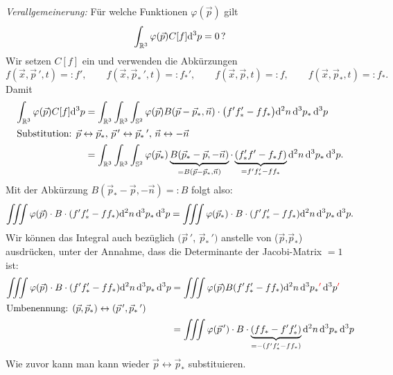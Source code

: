 \emph{Verallgemeinerung:} Für welche Funktionen $\varphi(\vec{p})$ gilt
\[ \int_{\mathbb{R}^3} \varphi(\vec{p}) C[f] \mathrm{d}^3 p = 0 \, ? \]
Wir setzen $C[f]$ ein und verwenden die Abkürzungen
\[ f( \vec{x}, \vec{p}\,', t ) =: f', \qquad
  f( \vec{x}, \vec{p}_*\,', t ) =: f_*', \qquad
  f( \vec{x}, \vec{p}, t ) =: f, \qquad
  f( \vec{x}, \vec{p}_*, t ) =: f_*. \]
Damit 
\begin{align*}
  \int_{\mathbb{R}^3} \varphi(\vec{p}) C[f] \mathrm{d}^3 p
  &= \int_{\mathbb{R}^3} \int_{\mathbb{R}^3} \int_{\mathbb{S}^2}
    \varphi(\vec{p})
    B(\vec{p} - \vec{p}_*, \vec{n}) \cdot
    \big( f' f_*' - f f_* \big)
    \mathrm{d}^2 n \, \mathrm{d}^3 p_* \, \mathrm{d}^3 p \\
  \intertext{Substitution: $\vec{p} \leftrightarrow \vec{p}_*$,
  $\vec{p}\,' \leftrightarrow \vec{p}_*\,'$, $\vec{n} \leftrightarrow -\vec{n}$}
  &= \int_{\mathbb{R}^3} \int_{\mathbb{R}^3} \int_{\mathbb{S}^2}
    \varphi( \vec{p}_* )
    \underbrace{B(\vec{p}_* - \vec{p}, - \vec{n})}_{= B(\vec{p} - \vec{p}_*, \vec{n})} \cdot
    \underbrace{(f_*' f' - f_* f)}_{=f' f_*' - f f_*}
    \mathrm{d}^2 n \, \mathrm{d}^3 p_* \, \mathrm{d}^3 p.
\end{align*}
Mit der Abkürzung $B(\vec{p}_* - \vec{p}, - \vec{n}) =: B$ folgt also:
\[ \iiint \varphi(\vec{p}) \cdot B \cdot (f' f_*' - f f_*)
  \mathrm{d}^2 n \, \mathrm{d}^3 p_* \, \mathrm{d}^3 p
  = \iiint \varphi(\vec{p}_*) \cdot B \cdot (f' f_*' - f f_*)
  \mathrm{d}^2 n \, \mathrm{d}^3 p_* \, \mathrm{d}^3 p. \]
Wir können das Integral auch bezüglich $(\vec{p}\,'$, $\vec{p}_*\,')$ anstelle
von ($\vec{p}$,$\vec{p}_*$) ausdrücken, unter der Annahme, dass die Determinante
der Jacobi-Matrix $=1$ ist:
\begin{align*}
  \iiint \varphi(\vec{p}) \cdot B \cdot (f' f_*' - f f_*)
    \mathrm{d}^2 n \, \mathrm{d}^3 p_* \, \mathrm{d}^3 p
  &= \iiint \varphi(\vec{p}) B (f' f_*' - f f_*)
    \mathrm{d}^2 n \, \mathrm{d}^3 p_*{\color{red}'} \, \mathrm{d}^3 p{\color{red}'} \\
  \intertext{Umbenennung: $(\vec{p}, \vec{p}_*) \leftrightarrow (\vec{p}\,',
  \vec{p}_*\,')$}
  &= \iiint \varphi(\vec{p}\,') \cdot B \cdot
    \underbrace{(f f_* - f' f_*')}_{= - (f'f_*' - ff_*)}
    \mathrm{d}^2 n \, \mathrm{d}^3 p_* \, \mathrm{d}^3 p
\end{align*}
Wie zuvor kann man kann wieder $\vec{p} \leftrightarrow \vec{p}_*$
substituieren.

